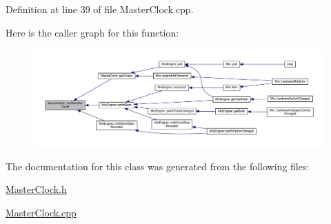 Definition at line 39 of file Master\+Clock.\+cpp.

Here is the caller graph for this function\+:
\nopagebreak
\begin{figure}[H]
\begin{center}
\leavevmode
\includegraphics[width=350pt]{class_master_clock_a5df4dcf8523b8186a7c73f9357376a01_icgraph}
\end{center}
\end{figure}


The documentation for this class was generated from the following files\+:\begin{DoxyCompactItemize}
\item 
\hyperlink{_master_clock_8h}{Master\+Clock.\+h}\item 
\hyperlink{_master_clock_8cpp}{Master\+Clock.\+cpp}\end{DoxyCompactItemize}
